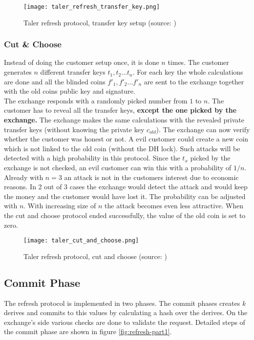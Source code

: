     \begin{figure}[htp]
        \centering
        \texttt{[image: taler\_refresh\_transfer\_key.png]}
        \caption{Taler refresh protocol, transfer key setup (source: \cite{pic:refresh-prot})}
        \label{fig:taler-refresh-transfer-key}
    \end{figure}
    \newpage
    \subsubsection{Cut \& Choose}
    Instead of doing the customer setup once, it is done $n$ times.
    The customer generates $n$ different transfer keys $t_1, t_2 \dots t_n$.
    For each key the whole calculations are done and all the blinded coins $f'_1, f'_2 \dots f'_n$ are sent to the exchange together with the old coins public key and signature. \\
    The exchange responds with a randomly picked number from $1$ to $n$.
    The customer has to reveal all the transfer keys, \textbf{except the one picked by the exchange.}
    The exchange makes the same calculations with the revealed private transfer keys (without knowing the private key $c_{old}$).
    The exchange can now verify whether the customer was honest or not.
    A evil customer could create a new coin which is not linked to the old coin (without the DH lock).
    Such attacks will be detected with a high probability in this protocol.
    Since the $t_x$ picked by the exchange is not checked, an evil customer can win this with a probability of $1/n$.
    Already with $n=3$ an attack is not in the customers interest due to economic reasons.
    In 2 out of 3 cases the exchange would detect the attack and would keep the money and the customer would have lost it.
    The probability can be adjusted with $n$.
    With increasing size of $n$ the attack becomes even less attractive.
    When the cut and choose protocol ended successfully, the value of the old coin is set to zero.

    \begin{figure}[htp]
        \centering
        \texttt{[image: taler\_cut\_and\_choose.png]}
        \caption{Taler refresh protocol, cut and choose (source: \cite{pic:refresh-prot})}
        \label{fig:taler-cut-and-choose}
    \end{figure}

    \subsection{Commit Phase}
    \label{sec:commit-phase-rsa}
    The refresh protocol is implemented in two phases.
    The commit phases creates $k$ derives and commits to this values by calculating a hash over the derives.
    On the exchange's side various checks are done to validate the request.
    Detailed steps of the commit phase are shown in figure  \ref{fig:refresh-part1}.



